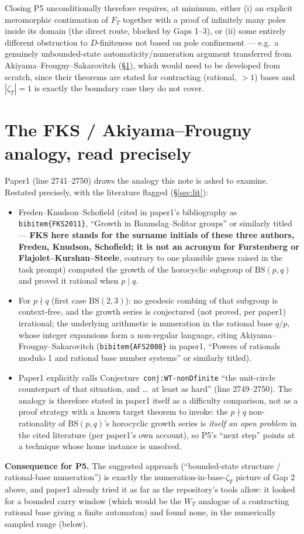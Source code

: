 \documentclass[11pt]{article}
\theoremstyle{remark}
\begin{document}
\noindent Closing P5 unconditionally therefore requires, at minimum, either (i) an explicit meromorphic
continuation of $F_T$ together with a proof of infinitely many poles inside its domain (the direct
route, blocked by Gaps 1--3), or (ii) some entirely different obstruction to $D$-finiteness not based on
pole confinement — e.g.\ a genuinely unbounded-state automaticity/numeration argument transferred from
Akiyama--Frougny--Sakarovitch (\S\ref{sec:analogy}), which would need to be developed from scratch, since
their theorems are stated for contracting (rational, $>1$) bases and $|\zeta_T|=1$ is exactly the
boundary case they do not cover.

\section{The FKS / Akiyama--Frougny analogy, read precisely}\label{sec:analogy}

Paper1 (line 2741--2750) draws the analogy this note is asked to examine. Restated precisely, with the
literature flagged (\S\ref{sec:lit}):
\begin{itemize}
\item Freden--Knudson--Schofield (cited in paper1's bibliography as
\texttt{bibitem\{FKS2011\}}, ``Growth in Baumslag--Solitar groups'' or similarly titled — \textbf{FKS
here stands for the surname initials of these three authors, Freden, Knudson, Schofield; it is not an
acronym for Furstenberg or Flajolet--Kurshan--Steele}, contrary to one plausible guess raised in the
task prompt) computed the growth of the horocyclic subgroup of $\mathrm{BS}(p,q)$ and proved it rational
when $p\mid q$.
\item For $p\nmid q$ (first case $\mathrm{BS}(2,3)$): no geodesic combing of that subgroup is
context-free, and the growth series is conjectured (not proved, per paper1) irrational; the underlying
arithmetic is numeration in the rational base $q/p$, whose integer expansions form a non-regular
language, citing Akiyama--Frougny--Sakarovitch (\texttt{bibitem\{AFS2008\}} in paper1, ``Powers of
rationals modulo 1 and rational base number systems'' or similarly titled).
\item Paper1 explicitly calls Conjecture~\texttt{conj:WT-nonDfinite} ``the unit-circle counterpart of
that situation, and \dots\ at least as hard'' (line 2749--2750). The analogy is therefore stated in
paper1 itself as a difficulty comparison, not as a proof strategy with a known target theorem to invoke:
the $p\nmid q$ non-rationality of $\mathrm{BS}(p,q)$'s horocyclic growth series is \emph{itself an open
problem} in the cited literature (per paper1's own account), so P5's ``next step'' points at a technique
whose home instance is unsolved.
\end{itemize}
\textbf{Consequence for P5.} The suggested approach (``bounded-state structure / rational-base
numeration'') is exactly the numeration-in-base-$\zeta_T$ picture of Gap 2 above, and paper1 already
tried it as far as the repository's tools allow: it looked for a bounded carry window (which would be
the $W_T$ analogue of a contracting rational base giving a finite automaton) and found none, in the
numerically sampled range (below).
\end{document}
